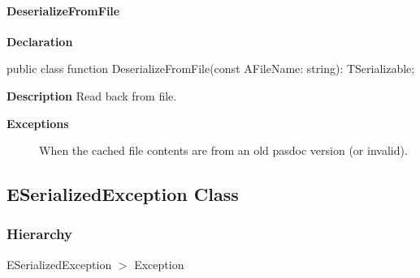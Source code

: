 \documentclass{report}
\newif\ifpdf
\begin{document}
\paragraph*{DeserializeFromFile}\hspace*{\fill}

\label{PasDoc_Serialize.TSerializable-DeserializeFromFile}
\begin{list}{}{
\setlength{\itemindent}{0cm}
\setlength{\listparindent}{0cm}
\setlength{\leftmargin}{\evensidemargin}
\addtolength{\leftmargin}{\tmplength}
\settowidth{\labelsep}{X}
\addtolength{\leftmargin}{\labelsep}
\setlength{\labelwidth}{\tmplength}
}
\item[\textbf{Declaration}\hfill]
\ifpdf
\begin{flushleft}
\fi
\begin{ttfamily}
public class function DeserializeFromFile(const AFileName: string): TSerializable;\end{ttfamily}

\ifpdf
\end{flushleft}
\fi

\par
\item[\textbf{Description}]
Read back from file. \par
\item[\textbf{Exceptions}]
\begin{description}
\item[\begin{ttfamily}EInvalidCacheFileVersion\end{ttfamily}(\ref{PasDoc_Serialize.EInvalidCacheFileVersion})] When the cached file contents are from an old pasdoc version (or invalid).
\end{description}


\end{list}
\ifpdf
\subsection*{\large{\textbf{ESerializedException Class}}\normalsize\hspace{1ex}\hrulefill}
\else
\subsection*{ESerializedException Class}
\fi
\label{PasDoc_Serialize.ESerializedException}
\subsubsection*{\large{\textbf{Hierarchy}}\normalsize\hspace{1ex}\hfill}
ESerializedException {$>$} Exception
\end{document}
